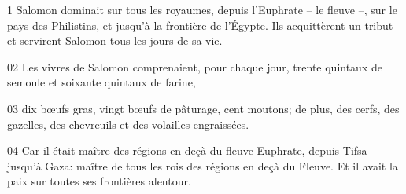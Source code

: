 1 Salomon dominait sur tous les royaumes, depuis l’Euphrate – le fleuve –, sur le pays des Philistins, et jusqu’à la frontière de l’Égypte. Ils acquittèrent un tribut et servirent Salomon tous les jours de sa vie.

02 Les vivres de Salomon comprenaient, pour chaque jour, trente quintaux de semoule et soixante quintaux de farine,

03 dix bœufs gras, vingt bœufs de pâturage, cent moutons; de plus, des cerfs, des gazelles, des chevreuils et des volailles engraissées.

04 Car il était maître des régions en deçà du fleuve Euphrate, depuis Tifsa jusqu’à Gaza: maître de tous les rois des régions en deçà du Fleuve. Et il avait la paix sur toutes ses frontières alentour.

